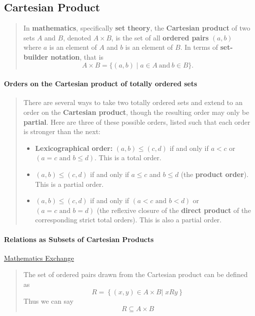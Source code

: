 \documentclass[a4paper, 11pt]{article}
\begin{document}
\subsection{Cartesian Product}
    \begin{quote}
        In \textbf{mathematics}, specifically \textbf{set theory}, the \textbf{Cartesian product} of two sets $A$ and $B$, denoted $A \times B$, is the set 
        of all \textbf{ordered pairs} $(a, b)$ where $a$ is an element of $A$ and $b$ is an element of $B$. In terms of \textbf{set-builder notation}, that is
        \[
            A \times B = \{(a, b) \mid a \in A \ \text{and} \ b \in B\}.
        \]
    \end{quote}
    \paragraph{Orders on the Cartesian product of totally ordered sets}
        \begin{quote}
            There are several ways to take two totally ordered sets and extend to an order on the \textbf{Cartesian product}, though the resulting order may 
            only be \textbf{partial}. Here are three of these possible orders, listed such that each order is stronger than the next:
            \begin{itemize}
                \item \textbf{Lexicographical order:} $(a,b) \le (c,d)$ if and only if $a < c$ or $(a = c \text{ and } b \le d)$. This is a total order.
                \item $(a,b) \le (c,d)$ if and only if $a \le c$ and $b \le d$ (the \textbf{product order}). This is a partial order.
                \item $(a,b) \le (c,d)$ if and only if $(a < c \text{ and } b < d)$ or $(a = c \text{ and } b = d)$ (the reflexive closure of the \textbf{direct product} of the corresponding strict total orders). This is also a partial order.
            \end{itemize}
        \end{quote}
    \paragraph{Relations as Subsets of Cartesian Products}\href{https://math.stackexchange.com/questions/2454926/relations-cartesian-product-explanation}{Mathematics Exchange}
        \begin{quote}
            The set of ordered pairs drawn from the Cartesian product can be defined as
            \begin{equation*}
                R = \left\{(x,y)\in A\times B|\;xRy\right\}
            \end{equation*}
            Thus we can say
            \begin{equation*}
                R\subseteq A\times B
            \end{equation*}
        \end{quote}
\end{document}
